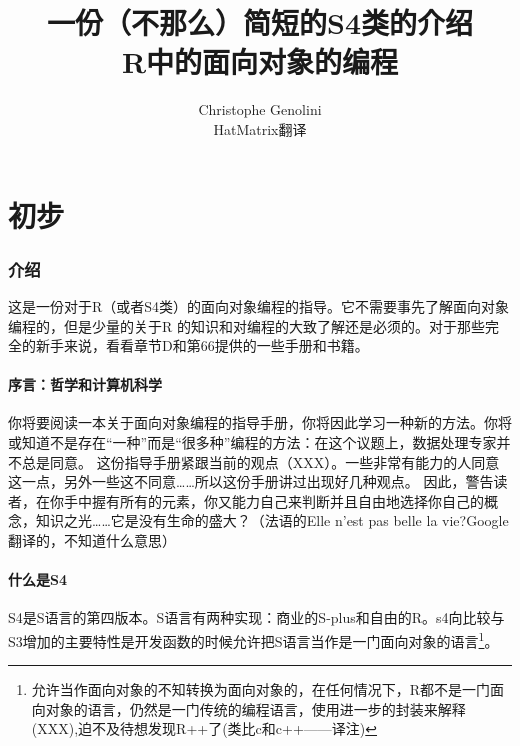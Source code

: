 \documentclass[12pt,a4paper]{article}\usepackage{graphicx, color}
\title{一份（不那么）简短的S4类的介绍\\[2ex]R中的面向对象的编程}
\author{Christophe Genolini{ }\\ HatMatrix翻译}
\begin{document}
\maketitle

\part{初步}
\section{介绍}
这是一份对于R（或者S4类）的面向对象编程的指导。它不需要事先了解面向对象编程的，但是少量的关于R
的知识和对编程的大致了解还是必须的。对于那些完全的新手来说，看看章节D和第66提供的一些手册和书籍。
\subsection{序言：哲学和计算机科学}
你将要阅读一本关于面向对象编程的指导手册，你将因此学习一种新的方法。你将或知道不是存在“一种”而是“很多种”编程的方法：在这个议题上，数据处理专家并不总是同意。
这份指导手册紧跟当前的观点（XXX）。一些非常有能力的人同意这一点，另外一些这不同意……所以这份手册讲过出现好几种观点。
因此，警告读者，在你手中握有所有的元素，你又能力自己来判断并且自由地选择你自己的概念，知识之光……它是没有生命的盛大？（法语的Elle n’est pas
belle la vie?Google翻译的，不知道什么意思）

\subsection{什么是S4}
S4是S语言的第四版本。S语言有两种实现：商业的S-plus和自由的R。s4向比较与S3增加的主要特性是开发函数的时候允许把S语言当作是一门面向对象的语言\footnote{允许当作面向对象的不知转换为面向对象的，在任何情况下，R都不是一门面向对象的语言，仍然是一门传统的编程语言，使用进一步的封装来解释(XXX),迫不及待想发现R++了(类比c和c++——译注)}。
\end{document}
